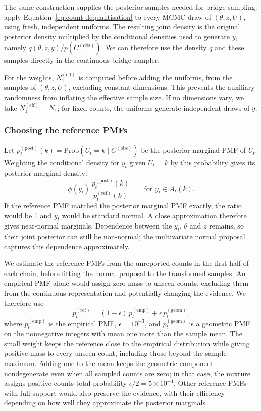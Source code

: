 \documentclass{article}
\newcommand{\Prob}[1]{\mathrm{Prob}\left(#1\right)}
\begin{document}
The same construction supplies the posterior samples needed for bridge
sampling: apply Equation~\eqref{eq:count-dequantisation} to every MCMC draw
of \((\theta,z,U)\), using fresh, independent uniforms. The resulting
joint density is the original posterior density multiplied by the
conditional densities used to generate \(y\), namely
\(q(\theta,z,y)/p(C^{(\mathrm{obs})})\). We can therefore use the density
\(q\) and these samples directly in the continuous bridge sampler.

For the weights, \(N_1^{(\mathrm{eff})}\) is computed before adding the
uniforms, from the samples of \((\theta,z,U)\), excluding constant
dimensions. This prevents the auxiliary randomness from inflating the
effective sample size. If no dimensions vary, we take
\(N_1^{(\mathrm{eff})}=N_1\); for fixed counts, the uniforms generate
independent draws of \(y\).

\subsubsection{Choosing the reference PMFs}

Let \(p_t^{(\mathrm{post})}(k)=\Prob{U_t=k\mid C^{(\mathrm{obs})}}\) be the
posterior marginal PMF of \(U_t\). Weighting the conditional density for
\(y_t\) given \(U_t=k\) by this probability gives its posterior marginal
density:
\begin{equation}
  \phi(y_t)\,\frac{p_t^{(\mathrm{post})}(k)}{p_t^{(\mathrm{ref})}(k)}
  \qquad\text{for }y_t\in A_t(k).
\end{equation}
If the reference PMF matched the posterior marginal PMF exactly, the ratio
would be 1 and \(y_t\) would be standard normal. A close approximation
therefore gives near-normal marginals. Dependence between the \(y_t\),
\(\theta\) and \(z\) remains, so their joint posterior can still be
non-normal; the multivariate normal proposal captures this dependence
approximately.

We estimate the reference PMFs from the unreported counts in the first
half of each chain, before fitting the normal proposal to the transformed
samples. An empirical PMF alone would assign zero mass to unseen counts,
excluding them from the continuous representation and potentially changing
the evidence. We therefore use
\begin{equation}
  p_t^{(\mathrm{ref})}=(1-\epsilon)\,p_t^{(\mathrm{emp})}
  +\epsilon\,p_t^{(\mathrm{geom})},
\end{equation}
where \(p_t^{(\mathrm{emp})}\) is the empirical PMF, \(\epsilon=10^{-3}\),
and \(p_t^{(\mathrm{geom})}\) is a geometric PMF on the nonnegative integers
with mean one more than the sample mean. The small weight keeps the
reference close to the empirical distribution while giving positive mass
to every unseen count, including those beyond the sample maximum. Adding
one to the mean keeps the geometric component nondegenerate even when all
sampled counts are zero; in that case, the mixture assigns positive counts
total probability \(\epsilon/2=5\times10^{-4}\). Other reference PMFs with
full support would also preserve the evidence, with their efficiency
depending on how well they approximate the posterior marginals.
\end{document}
